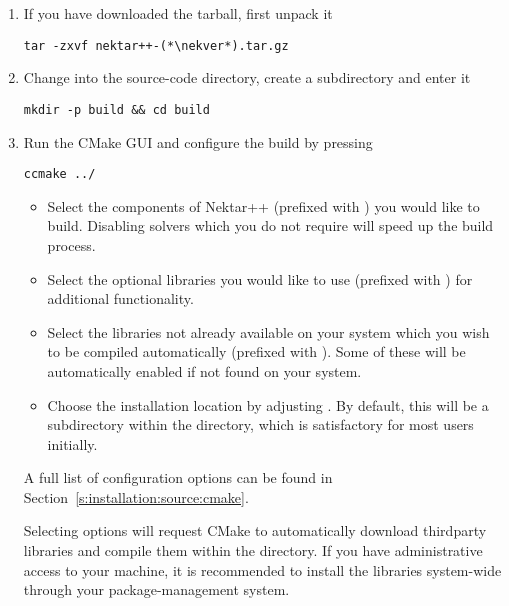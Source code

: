 \begin{enumerate}
    \item If you have downloaded the tarball, first unpack it
    \begin{lstlisting}[style=BashInputStyle]
tar -zxvf nektar++-(*\nekver*).tar.gz
    \end{lstlisting}

    \item Change into the source-code directory, create a 
    subdirectory and enter it
    \begin{lstlisting}[style=BashInputStyle]
    mkdir -p build && cd build
    \end{lstlisting}

    \item Run the CMake GUI and configure the build by pressing 
    \begin{lstlisting}[style=BashInputStyle]
    ccmake ../
    \end{lstlisting}
    \begin{itemize}
        \item Select the components of Nektar++ (prefixed with
        ) you would like to build. Disabling solvers
        which you do not require will speed up the build process.
        \item Select the optional libraries you would like to use (prefixed with
        ) for additional functionality.
        \item Select the libraries not already available on your system which
        you wish to be compiled automatically (prefixed with
        ). Some of these will be automatically enabled if not found on your system.
        \item Choose the installation location by adjusting . By default, this will be a  subdirectory within the  directory, which is satisfactory for most users initially.
    \end{itemize}
    A full list of configuration options can be found in
    Section~\ref{s:installation:source:cmake}.

    \begin{notebox}
    Selecting  options will request CMake to
    automatically download thirdparty libraries and compile them within the
    \nekpp directory. If you have administrative access to your machine, it is
    recommended to install the libraries system-wide through your
    package-management system.\\[3pt]
    

\end{notebox}
\end{enumerate}
